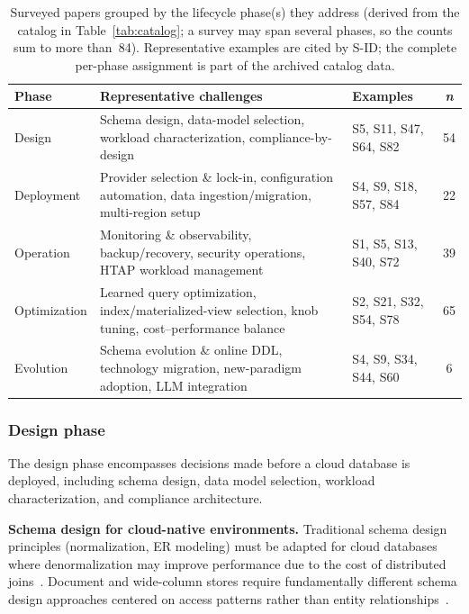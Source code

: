 \documentclass[a4paper,fleqn]{cas-sc}
\begin{document}
\begin{table}[t]
\centering
\caption{Surveyed papers grouped by the lifecycle phase(s) they address (derived from the catalog in Table~\ref{tab:catalog}; a survey may span several phases, so the counts sum to more than~84). Representative examples are cited by S-ID; the complete per-phase assignment is part of the archived catalog data.}
\label{tab:lifecycle-phases}
\small
\begin{tabular}{p{1.9cm} >{\raggedright\arraybackslash}p{6.4cm} >{\raggedright\arraybackslash}p{3.2cm} c}
\toprule
\textbf{Phase} & \textbf{Representative challenges} & \textbf{Examples} & \textbf{\textit{n}} \\
\midrule
Design & Schema design, data-model selection, workload characterization, compliance-by-design & S5, S11, S47, S64, S82 & 54 \\
\addlinespace
Deployment & Provider selection \& lock-in, configuration automation, data ingestion/migration, multi-region setup & S4, S9, S18, S57, S84 & 22 \\
\addlinespace
Operation & Monitoring \& observability, backup/recovery, security operations, HTAP workload management & S1, S5, S13, S40, S72 & 39 \\
\addlinespace
Optimization & Learned query optimization, index/materialized-view selection, knob tuning, cost--performance balance & S2, S21, S32, S54, S78 & 65 \\
\addlinespace
Evolution & Schema evolution \& online DDL, technology migration, new-paradigm adoption, LLM integration & S4, S9, S34, S44, S60 & 6 \\
\bottomrule
\end{tabular}
\end{table}

\subsubsection{Design phase}
\label{subsubsec:design}

The design phase encompasses decisions made before a cloud database is deployed, including schema design, data model selection, workload characterization, and compliance architecture.

\textbf{Schema design for cloud-native environments.} Traditional schema design principles (normalization, ER modeling) must be adapted for cloud databases where denormalization may improve performance due to the cost of distributed joins~\cite{Li2024CloudNativeSurvey}. Document and wide-column stores require fundamentally different schema design approaches centered on access patterns rather than entity relationships~\cite{Davoudian2018NoSQL,Mouhibha2025NoSQLDW,Ferreira2023NoSQLMD,Mouhibha2026Clustering}.
\end{document}
